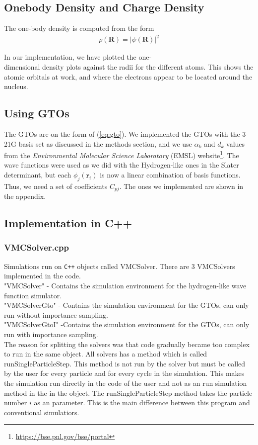 \documentclass[twocolumns, a4paper,11pt,fleqn]{extarticle}
\newcommand{\eq}[1]{{\small\begin{align*}#1\end{align*}}}
\renewcommand\vec[1]{\boldsymbol{\mathbf{#1}}}
\begin{document}
\subsection{Onebody Density and Charge Density}
The one-body density is computed from the form
{\small
\eq{
	\rho(\vec R) = |\psi(\vec R)|^2
}}%

In our implementation, 
we have plotted the one-\\dimensional
density plots against the radii for the different atoms.
This shows the atomic orbitals at work, and where the electrons appear to be located
around the nucleus.

\subsection{Using GTOs}
The GTOs are on the form of (\ref{eq:gto}).
We implemented the GTOs with the 3-21G basis set as discussed in the
methods section, and we use $\alpha_k$ and $d_k$ values from the 
\textit{Environmental Molecular Science Laboratory} (EMSL) 
website\footnote{\url{https://bse.pnl.gov/bse/portal}}. The wave functions were used as
we did with the Hydrogen-like ones
in the Slater determinant, but each $\phi_j(\vec r_i)$ is now a linear combination
of basis functions. Thus, we need a set of coefficients $C_{pj}$.
The ones we implemented are shown in the appendix.

\subsection{Implementation in C++}
\subsubsection{VMCSolver.cpp}
Simulations run on \verb!C++! objects called VMCSolver. There are 3 VMCSolvers
implemented in the code.\\
"VMCSolver" - Contains the simulation environment for the hydrogen-like wave
function simulator.\\
"VMCSolverGto" - Contains the simulation environment for the GTOs, can only run
without importance sampling.\\
"VMCSolverGtoI" -Contains the simulation environment for the GTOs, can only run
with importance sampling.\\

The reason for splitting the solvers was that code gradually became too complex
to run in the same object. All solvers has a method which is called
runSingleParticleStep. This method is not run by the solver but must be called
by the user for every particle and for every cycle in the simulation. 
This makes the simulation run directly in the code of the user and not 
as an run simulation method in the in the object. The runSingleParticleStep method
takes the particle number $i$ as an parameter. This is the main difference between
this program and conventional simulatiors. 
\end{document}
